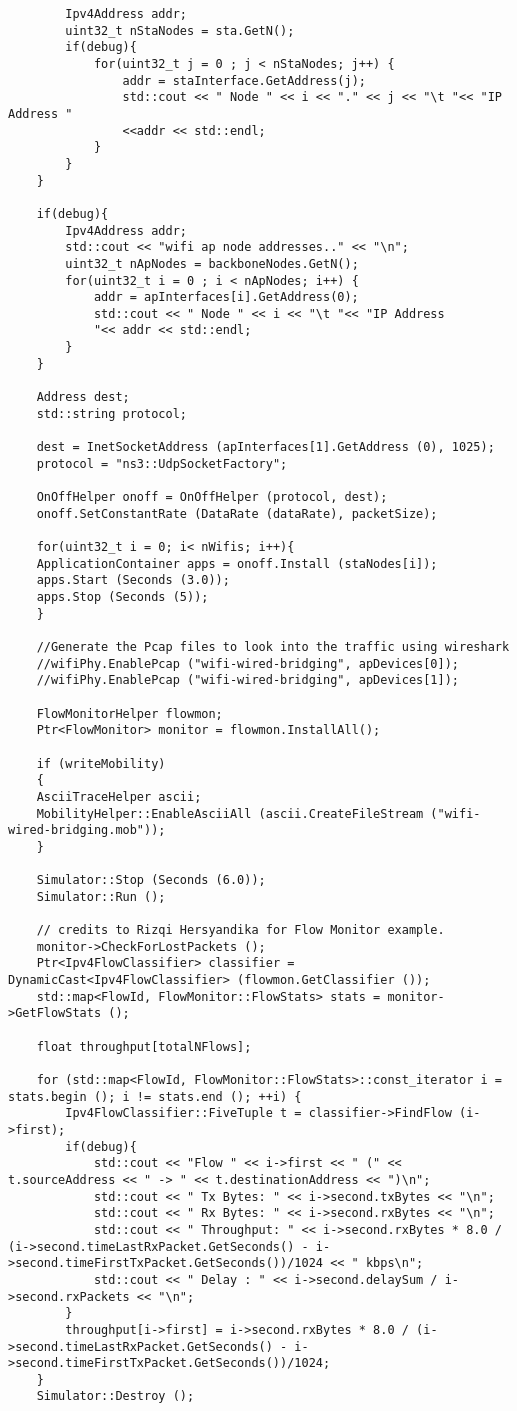 \begin{lstlisting}
		Ipv4Address addr;
		uint32_t nStaNodes = sta.GetN();
		if(debug){
			for(uint32_t j = 0 ; j < nStaNodes; j++) {
				addr = staInterface.GetAddress(j);
				std::cout << " Node " << i << "." << j << "\t "<< "IP Address " 
				<<addr << std::endl;
			}
		}
	}
	
	if(debug){
		Ipv4Address addr;
		std::cout << "wifi ap node addresses.." << "\n";
		uint32_t nApNodes = backboneNodes.GetN();
		for(uint32_t i = 0 ; i < nApNodes; i++) {
			addr = apInterfaces[i].GetAddress(0);
			std::cout << " Node " << i << "\t "<< "IP Address 
			"<< addr << std::endl;
		}
	}
	
	Address dest;
	std::string protocol;
	
	dest = InetSocketAddress (apInterfaces[1].GetAddress (0), 1025);
	protocol = "ns3::UdpSocketFactory";
	
	OnOffHelper onoff = OnOffHelper (protocol, dest);
	onoff.SetConstantRate (DataRate (dataRate), packetSize);
	
	for(uint32_t i = 0; i< nWifis; i++){
	ApplicationContainer apps = onoff.Install (staNodes[i]);
	apps.Start (Seconds (3.0));
	apps.Stop (Seconds (5));
	}
	
	//Generate the Pcap files to look into the traffic using wireshark
	//wifiPhy.EnablePcap ("wifi-wired-bridging", apDevices[0]);
	//wifiPhy.EnablePcap ("wifi-wired-bridging", apDevices[1]);
	
	FlowMonitorHelper flowmon;
	Ptr<FlowMonitor> monitor = flowmon.InstallAll();
	
	if (writeMobility)
	{
	AsciiTraceHelper ascii;
	MobilityHelper::EnableAsciiAll (ascii.CreateFileStream ("wifi-wired-bridging.mob"));
	}
	
	Simulator::Stop (Seconds (6.0));
	Simulator::Run ();
	
	// credits to Rizqi Hersyandika for Flow Monitor example.
	monitor->CheckForLostPackets ();
	Ptr<Ipv4FlowClassifier> classifier = DynamicCast<Ipv4FlowClassifier> (flowmon.GetClassifier ());
	std::map<FlowId, FlowMonitor::FlowStats> stats = monitor->GetFlowStats ();
	
	float throughput[totalNFlows];
	
	for (std::map<FlowId, FlowMonitor::FlowStats>::const_iterator i = stats.begin (); i != stats.end (); ++i) {
		Ipv4FlowClassifier::FiveTuple t = classifier->FindFlow (i->first);
		if(debug){
			std::cout << "Flow " << i->first << " (" << t.sourceAddress << " -> " << t.destinationAddress << ")\n";
			std::cout << " Tx Bytes: " << i->second.txBytes << "\n";
			std::cout << " Rx Bytes: " << i->second.rxBytes << "\n";
			std::cout << " Throughput: " << i->second.rxBytes * 8.0 / (i->second.timeLastRxPacket.GetSeconds() - i->second.timeFirstTxPacket.GetSeconds())/1024 << " kbps\n";
			std::cout << " Delay : " << i->second.delaySum / i->second.rxPackets << "\n";
		}
		throughput[i->first] = i->second.rxBytes * 8.0 / (i->second.timeLastRxPacket.GetSeconds() - i->second.timeFirstTxPacket.GetSeconds())/1024;
	}
	Simulator::Destroy ();
	

\end{lstlisting}
